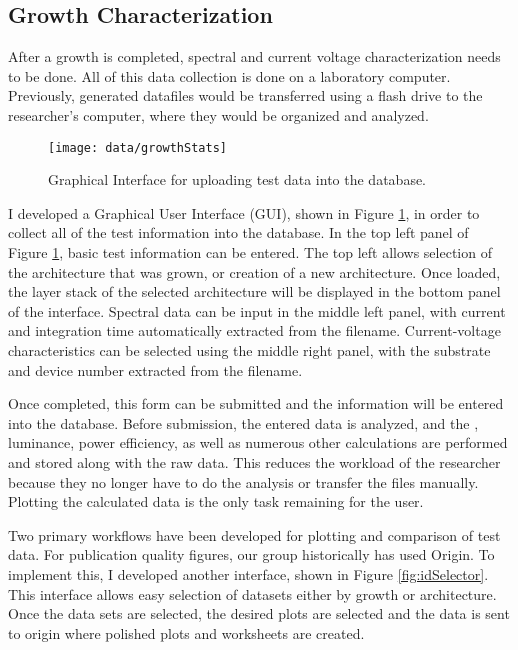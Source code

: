 \documentclass[../thesis.tex]{subfiles}
\begin{document}
\subsection{Growth Characterization}

After a growth is completed, spectral and current voltage characterization needs to be done.
All of this data collection is done on a laboratory computer.
Previously, generated datafiles would be transferred using a flash drive to the researcher's computer, where they would be organized and analyzed.

\begin{figure}[ht]
\centering
\texttt{[image: data/growthStats]}
\caption{Graphical Interface for uploading test data into the database.}
\label{fig:growthStats}
\end{figure}

I developed a Graphical User Interface (GUI), shown in Figure \ref{fig:growthStats}, in order to collect all of the test information into the database.
In the top left panel of Figure \ref{fig:growthStats}, basic test information can be entered.  
The top left allows selection of the architecture that was grown, or creation of a new architecture.
Once loaded, the layer stack of the selected architecture will be displayed in the bottom panel of the interface.
Spectral data can be input in the middle left panel, with current and integration time automatically extracted from the filename.
Current-voltage characteristics can be selected using the middle right panel, with the substrate and device number extracted from the filename.

Once completed, this form can be submitted and the information will be entered into the database.
Before submission, the entered data is analyzed, and the \eqe, luminance, power efficiency, as well as numerous other calculations are performed and stored along with the raw data.
This reduces the workload of the researcher because they no longer have to do the analysis or transfer the files manually.
Plotting the calculated data is the only task remaining for the user.

Two primary workflows have been developed for plotting and comparison of test data.  
For publication quality figures, our group historically has used Origin.  
To implement this, I developed another interface, shown in Figure \ref{fig:idSelector}.
This interface allows easy selection of datasets either by growth or architecture.
Once the data sets are selected, the desired plots are selected and the data is sent to origin where polished plots and worksheets are created.
\end{document}
